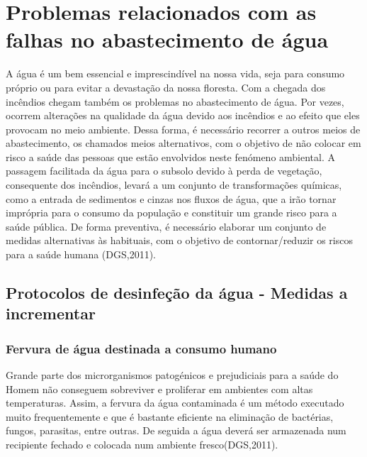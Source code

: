 \documentclass[a4paper,11pt]{report}
\begin{document}
\chapter{Problemas relacionados com as falhas no abastecimento de água}
A água é um bem essencial e imprescindível na nossa vida, seja para consumo próprio ou para evitar a devastação da nossa floresta. Com a chegada dos incêndios chegam também os problemas no abastecimento de água. 
Por vezes, ocorrem alterações na qualidade da água devido aos incêndios e ao efeito que eles provocam no meio ambiente. Dessa forma, é necessário recorrer a outros meios de abastecimento, os chamados meios alternativos, com o objetivo de não colocar em risco a saúde das pessoas que estão envolvidos neste fenómeno ambiental. A passagem facilitada da água para o subsolo devido à perda de vegetação, consequente dos incêndios, levará a um conjunto de transformações químicas, como a entrada de sedimentos e cinzas nos fluxos de água, que a irão tornar imprópria para o consumo da população e constituir um grande risco para a saúde pública.
De forma preventiva, é necessário elaborar um conjunto de medidas alternativas às habituais, com o objetivo de contornar/reduzir os riscos para a saúde humana  (DGS,2011).


\section{Protocolos de desinfeção da água - Medidas a incrementar}

\subsection{Fervura de água destinada a consumo humano}
Grande parte dos microrganismos patogénicos e prejudiciais para a saúde do Homem não conseguem sobreviver e proliferar em ambientes com altas temperaturas. Assim, a fervura da água contaminada é um método executado muito frequentemente e que é bastante eficiente na eliminação de bactérias, fungos, parasitas, entre outras. De seguida a água deverá ser armazenada num recipiente fechado e colocada num ambiente fresco(DGS,2011).
\end{document}
